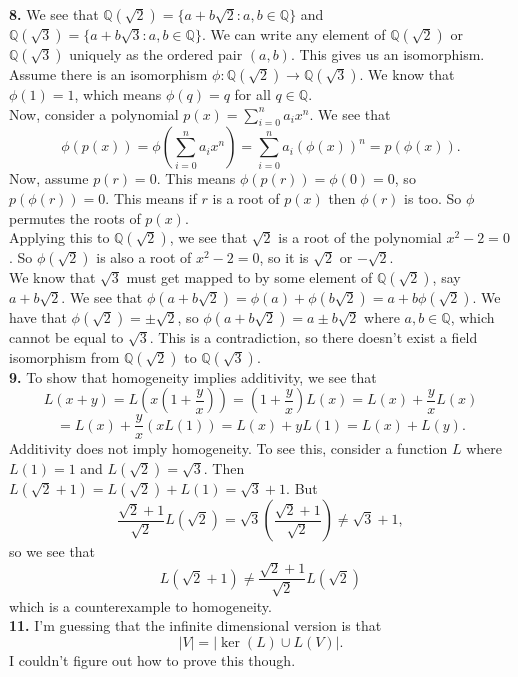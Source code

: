 \documentclass{article}
\newcommand{\Q}{\mathbb{Q}}
\begin{document}
\textbf{8.} We see that $\Q(\sqrt{2}) = \{a + b\sqrt{2}: a, b \in \Q\}$ and $\Q(\sqrt{3}) = \{a + b\sqrt{3}: a, b \in \Q\}$. We can write any element of $\Q(\sqrt{2})$ or $\Q(\sqrt{3})$ uniquely as the ordered pair $(a, b)$. This gives us an isomorphism. \\

Assume there is an isomorphism $\phi: \Q(\sqrt{2}) \to \Q(\sqrt{3})$. We know that $\phi(1) = 1$, which means $\phi(q) = q$ for all $q \in \Q$. \\

Now, consider a polynomial $p(x) = \sum_{i = 0}^n a_ix^n$. We see that $$\phi(p(x)) = \phi\left(\sum_{i = 0}^n a_ix^n\right) = \sum_{i = 0}^n a_i(\phi(x))^n = p(\phi(x)).$$
Now, assume $p(r) = 0$. This means $\phi(p(r)) = \phi(0) = 0$, so $p(\phi(r)) = 0$. This means if $r$ is a root of $p(x)$ then $\phi(r)$ is too. So $\phi$ permutes the roots of $p(x)$. \\

Applying this to $\Q(\sqrt{2})$, we see that $\sqrt{2}$ is a root of the polynomial $x^2 - 2 = 0$. So $\phi(\sqrt{2})$ is also a root of $x^2 - 2 = 0$, so it is $\sqrt{2}$ or $-\sqrt{2}$. \\

We know that $\sqrt{3}$ must get mapped to by some element of $\Q(\sqrt{2})$, say $a + b\sqrt{2}$. We see that $\phi(a + b\sqrt{2}) = \phi(a) + \phi(b\sqrt{2}) = a + b\phi(\sqrt{2})$. We have that $\phi(\sqrt{2}) = \pm \sqrt{2}$, so $\phi(a + b\sqrt{2}) = a \pm b\sqrt{2}$ where $a, b \in \Q$, which cannot be equal to $\sqrt{3}$. This is a contradiction, so there doesn't exist a field isomorphism from $\Q(\sqrt{2})$ to $\Q(\sqrt{3})$. \\

\textbf{9.} To show that homogeneity implies additivity, we see that
$$L(x + y) = L\left(x\left(1 + \frac{y}{x}\right)\right) = \left(1 + \frac{y}{x}\right)L(x) = L(x) + \frac{y}{x}L(x)$$
$$= L(x) + \frac{y}{x}(xL(1)) = L(x) + yL(1) = L(x) + L(y).$$
Additivity does not imply homogeneity. To see this, consider a function $L$ where $L(1) = 1$ and $L(\sqrt{2}) = \sqrt{3}$. Then $L(\sqrt{2} + 1) = L(\sqrt{2}) + L(1) = \sqrt{3} + 1$. But
$$\frac{\sqrt{2} + 1}{\sqrt{2}}L(\sqrt{2}) = \sqrt{3}\left(\frac{\sqrt{2} + 1}{\sqrt{2}}\right) \neq \sqrt{3} + 1,$$
so we see that
$$L(\sqrt{2} + 1) \neq \frac{\sqrt{2} + 1}{\sqrt{2}}L(\sqrt{2})$$
which is a counterexample to homogeneity. \\

\textbf{11.} I'm guessing that the infinite dimensional version is that $$|V| = |\ker(L) \cup L(V)|.$$ I couldn't figure out how to prove this though.
\end{document}
